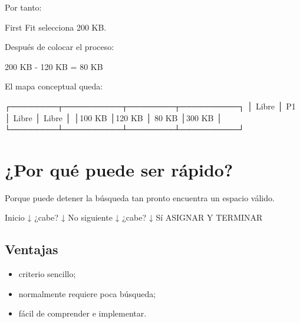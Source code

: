 \documentclass[
  spanish,
  letterpaper,
]{scrbook}
\newenvironment{Shaded}{\begin{snugshade}}{\end{snugshade}}
\newcommand{\NormalTok}[1]{\textcolor[rgb]{0.00,0.23,0.31}{#1}}
\providecommand{\tightlist}{%
  \setlength{\itemsep}{0pt}\setlength{\parskip}{0pt}}
\begin{document}
Por tanto:

\begin{Shaded}
\begin{Highlighting}[]
\NormalTok{First Fit selecciona 200 KB.}
\end{Highlighting}
\end{Shaded}

Después de colocar el proceso:

\begin{Shaded}
\begin{Highlighting}[]
\NormalTok{200 KB {-} 120 KB = 80 KB}
\end{Highlighting}
\end{Shaded}

El mapa conceptual queda:

\begin{Shaded}
\begin{Highlighting}[]
\NormalTok{┌────────┬──────────┬────────┬──────────┐}
\NormalTok{│ Libre  │ P1       │ Libre  │ Libre    │}
\NormalTok{│100 KB  │120 KB    │ 80 KB  │300 KB   │}
\NormalTok{└────────┴──────────┴────────┴──────────┘}
\end{Highlighting}
\end{Shaded}

\section{¿Por qué puede ser
rápido?}\label{por-quuxe9-puede-ser-ruxe1pido-1}

Porque puede detener la búsqueda tan pronto encuentra un espacio válido.

\begin{Shaded}
\begin{Highlighting}[]
\NormalTok{Inicio}
\NormalTok{  ↓}
\NormalTok{¿cabe?}
\NormalTok{  ↓ No}
\NormalTok{siguiente}
\NormalTok{  ↓}
\NormalTok{¿cabe?}
\NormalTok{  ↓ Sí}
\NormalTok{ASIGNAR Y TERMINAR}
\end{Highlighting}
\end{Shaded}

\subsection{Ventajas}\label{ventajas-12}

\begin{itemize}
\tightlist
\item
  criterio sencillo;
\item
  normalmente requiere poca búsqueda;
\item
  fácil de comprender e implementar.
\end{itemize}
\end{document}
